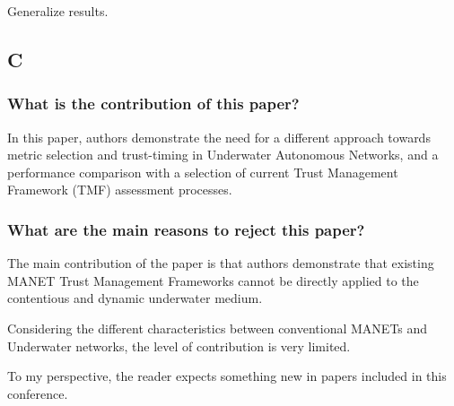 \documentclass[runningheads,a4paper]{llncs}
\begin{document}
Generalize results.


\subsection{C}

\subsubsection{What is the contribution of this paper?}

In this paper, authors demonstrate the need for a different approach towards metric selection and trust-timing in Underwater Autonomous Networks, and a performance comparison with a selection of current Trust Management Framework (TMF) assessment processes.


\subsubsection{What are the main reasons to reject this paper?}

The main contribution of the paper is that authors demonstrate that existing MANET Trust Management Frameworks cannot be directly applied to the contentious and dynamic underwater medium. 

Considering the different characteristics between conventional MANETs and Underwater networks, the level of contribution is very limited.

To my perspective, the reader expects something new in papers included in this conference. 

% 
\end{document}
